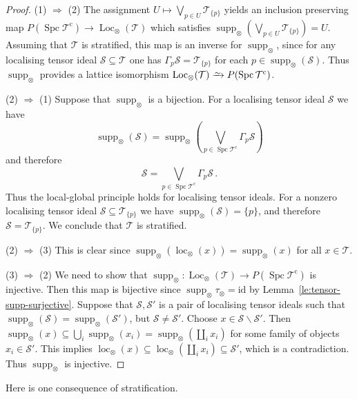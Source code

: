 \documentclass{amsart}[a4]
\theoremstyle{definition}
\theoremstyle{remark}
\numberwithin{equation}{section}
\newcommand{\loc}{\operatorname{loc}}
\newcommand{\Loc}{\operatorname{Loc}}
\newcommand{\Spc}{\operatorname{Spc}}
\newcommand{\supp}{\operatorname{supp}}
\newcommand{\iso}{\xrightarrow{\raisebox{-.6ex}[0ex][0ex]{$\scriptstyle{\sim}$}}}
\newcommand{\id}{\mathrm{id}}
\newcommand{\cat}{\mathcal}
\let\Gamma\varGamma
\begin{document}
\begin{proof}
  (1) $\Rightarrow$ (2) The assignment
  $ U\mapsto \bigvee_{p\in U}\cat T_{\{p\}}$ yields an inclusion
  preserving map $P(\Spc\cat T^{\mathrm c})\to \Loc_\otimes(\cat T)$ which
  satisfies $\supp_\otimes(\bigvee_{p\in U}\cat T_{\{p\}})=U$.
  Assuming that $\cat T$ is stratified, this map is an inverse for
  $\supp_\otimes$, since for any localising tensor ideal
  $\cat S\subseteq\cat T$ one has $\Gamma_p\cat S=\cat T_{\{p\}}$ for
  each $p\in\supp_\otimes(\cat S)$. Thus $\supp_\otimes$ provides a
  lattice isomorphism $\Loc_\otimes(\cat T)\iso P(\Spc\cat T^{\mathrm c})$.

  (2) $\Rightarrow$ (1) Suppose that $\supp_\otimes$ is a
  bijection. For a localising tensor ideal $\cat S$ we have
\[\supp_\otimes(\cat S)=\supp_\otimes\left(\bigvee_{p\in\Spc\cat T^{\mathrm c}}\Gamma_p\cat S\right)\]
and therefore
\[\cat S=\bigvee_{p\in\Spc\cat T^{\mathrm c}}\Gamma_p\cat S\,.\]
Thus the local-global principle holds for localising tensor
ideals. For a nonzero localising tensor ideal
$\cat S\subseteq \cat T_{\{p\}}$ we have
$\supp_\otimes(\cat S)=\{p\}$, and therefore $\cat S=\cat T_{\{p\}}$. We
conclude that $\cat T$ is stratified.

(2) $\Rightarrow$ (3) This is clear since
$\supp_\otimes(\loc_\otimes (x))=\supp_\otimes(x)$ for all
$x\in\cat T$.

  (3) $\Rightarrow$ (2) We need to show that
  $\supp_\otimes\colon\Loc_\otimes(\cat T)\to P(\Spc\cat T^{\mathrm c})$ is
  injective. Then this map is bijective since
  $\supp_\otimes\tau_\otimes=\id$ by
  Lemma~\ref{le:tensor-supp-surjective}. Suppose that $\cat S,\cat S'$ is a
  pair of localising tensor ideals such that
  $\supp_\otimes(\cat S)= \supp_\otimes(\cat S')$, but
  $\cat S\neq\cat S'$. Choose $x\in\cat S\smallsetminus\cat S'$. Then
  $\supp_\otimes(x)\subseteq
  \bigcup_i\supp_\otimes(x_i)=\supp_\otimes(\coprod_i x_i)$ for some
  family of objects $x_i\in\cat S'$. This implies
  $\loc_\otimes(x)\subseteq\loc_\otimes(\coprod_i x_i)\subseteq\cat
  S'$, which is a contradiction. Thus $\supp_\otimes$ is injective.
\end{proof}

Here is one consequence of stratification.
\end{document}
